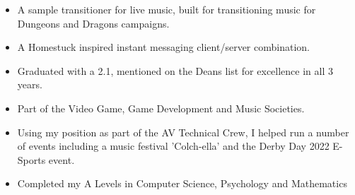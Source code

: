 \documentclass[10pt,a4paper,ragged2e,withhyper]{altacv}
\begin{document}

\divider


\begin{itemize}
	\item A sample transitioner for live music, built for transitioning music for Dungeons and Dragons campaigns.
\end{itemize}


\divider


\begin{itemize}
	\item A Homestuck inspired instant messaging client/server combination.
\end{itemize}




\begin{itemize}
	\item Graduated with a 2.1, mentioned on the Deans list for excellence in all 3 years.
	\item Part of the Video Game, Game Development and Music Societies.
	\item Using my position as part of the AV Technical Crew, I helped run a number of events including a music festival 'Colch-ella' and the Derby Day 2022 E-Sports event.
\end{itemize}


\divider


\begin{itemize}
	\item Completed my A Levels in Computer Science, Psychology and Mathematics
\end{itemize}


\end{document}
